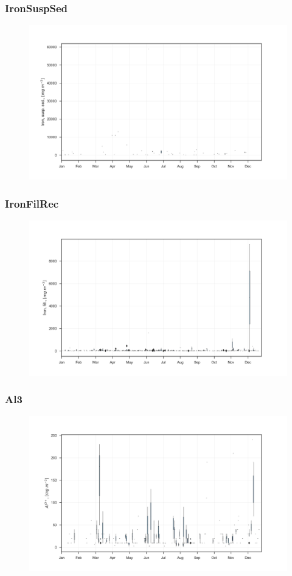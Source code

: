 \documentclass{beamer}
\begin{document}
\begin{frame}
\frametitle{IronSuspSed}
\begin{figure}
\includegraphics[width=\textwidth]{rivers/all/1yr_boxpl/IronSuspSed.png}
\end{figure}
\end{frame}

\begin{frame}
\frametitle{IronFilRec}
\begin{figure}
\includegraphics[width=\textwidth]{rivers/all/1yr_boxpl/IronFilRec.png}
\end{figure}
\end{frame}

\begin{frame}
\frametitle{Al3}
\begin{figure}
\includegraphics[width=\textwidth]{rivers/all/1yr_boxpl/Al3.png}
\end{figure}
\end{frame}
\end{document}

